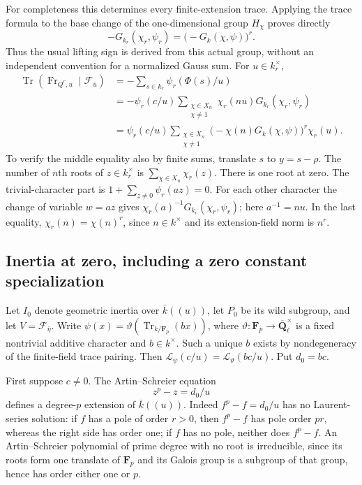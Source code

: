 For completeness this determines every finite-extension trace.
Applying the trace formula to the base change of the
one-dimensional group \(H_\chi\) proves directly
\[
 -G_{k_r}(\chi_r,\psi_r)
       =\bigl(-G_k(\chi,\psi)\bigr)^r.
 \tag{SPF.20}\label{eq:SPF20}
\]
Thus the usual lifting sign is derived from this actual group,
without an independent convention for a normalized Gauss sum.
For \(u\in k_r^\times\),
\[
 \begin{split}
 \operatorname{Tr}(\operatorname{Fr}_{Q^r,u}\mid\mathcal F_{\bar u})
  &=-\sum_{s\in k_r}\psi_r(\Phi(s)/u)\\
  &=-\psi_r(c/u)
       \sum_{\substack{\chi\in X_n\\\chi\ne1}}
           \chi_r(nu)G_{k_r}(\chi_r,\psi_r)\\
  &=\psi_r(c/u)
       \sum_{\substack{\chi\in X_n\\\chi\ne1}}
          \bigl(-\chi(n)G_k(\chi,\psi)\bigr)^r\chi_r(u).
 \end{split}
 \tag{SPF.21}\label{eq:SPF21}
\]
To verify the middle equality also by finite sums, translate
\(s\) to \(y=s-\rho\). The number of \(n\)th roots of
\(z\in k_r^\times\) is \(\sum_{\chi\in X_n}\chi_r(z)\).
There is one root at zero. The trivial-character part is
\(1+\sum_{z\ne0}\psi_r(az)=0\).
For each other character the change of variable \(w=az\)
gives \(\chi_r(a)^{-1}G_{k_r}(\chi_r,\psi_r)\);
here \(a^{-1}=nu\). In the last equality,
\(\chi_r(n)=\chi(n)^r\), since \(n\in k^\times\) and its
extension-field norm is \(n^r\).

\subsection{Inertia at zero, including a zero constant specialization}

Let \(I_0\) denote geometric inertia over
\(\bar k((u))\), let \(P_0\) be its wild subgroup, and let
\(V=\mathcal F_{\bar\eta}\).
Write \(\psi(x)=
\vartheta(\operatorname{Tr}_{k/\mathbf F_p}(b x))\), where
\(\vartheta:\mathbf F_p\to\overline{\mathbf Q}_\ell^\times\)
is a fixed nontrivial additive character and \(b\in k^\times\).
Such a unique \(b\) exists by nondegeneracy of the finite-field
trace pairing. Then
\(\mathcal L_\psi(c/u)=\mathcal L_\vartheta(bc/u)\).
Put \(d_0=bc\).

First suppose \(c\ne0\). The Artin--Schreier equation
\[
 z^p-z=d_0/u
 \tag{SPF.22}\label{eq:SPF22}
\]
defines a degree-\(p\) extension of \(\bar k((u))\).
Indeed \(f^p-f=d_0/u\) has no Laurent-series solution:
if \(f\) has a pole of order \(r>0\), then \(f^p-f\)
has pole order \(pr\), whereas the right side has order one;
if \(f\) has no pole, neither does \(f^p-f\).
An Artin--Schreier polynomial of prime degree with no root
is irreducible, since its roots form one translate of
\(\mathbf F_p\) and its Galois group is a subgroup of that
group, hence has order either one or \(p\).

